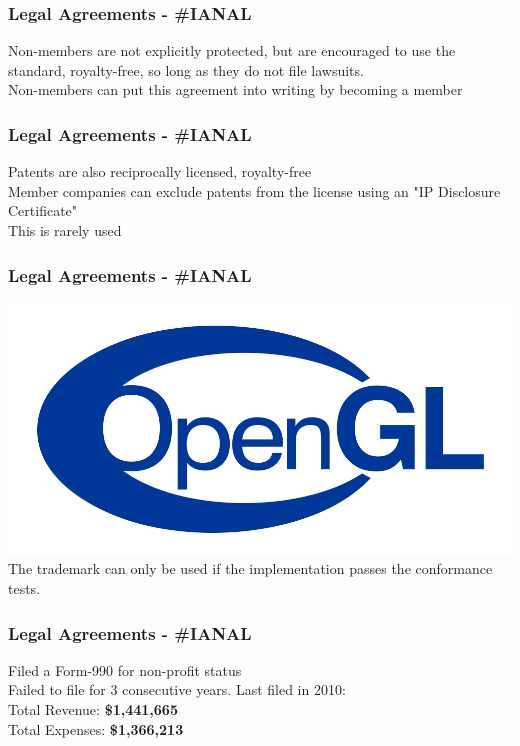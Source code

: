 \documentclass[10pt, compress]{beamer}
\begin{document}
\begin{frame}[fragile]
    \frametitle{Legal Agreements - \#IANAL}
    Non-members are not explicitly protected, but are encouraged to use the standard, royalty-free, so long as they do not file lawsuits.
    \\ \vspace{3mm}
    Non-members can put this agreement into writing by becoming a member
\end{frame}


\begin{frame}[fragile]
    \frametitle{Legal Agreements - \#IANAL}
    Patents are also reciprocally licensed, royalty-free
    \\ \vspace{3mm}
    Member companies can exclude patents from the license using an "IP Disclosure Certificate"
    \\ \vspace{3mm}
    This is rarely used
\end{frame}


\begin{frame}[fragile]
    \frametitle{Legal Agreements - \#IANAL}
    \includegraphics[width=\textwidth]{OpenGL-Logo.png}
    \\ \vspace{3mm}
    The trademark can only be used if the implementation passes the conformance tests.
\end{frame}


\begin{frame}[fragile]
    \frametitle{Legal Agreements - \#IANAL}
    \begin{center}
    Filed a Form-990 for non-profit status
    \\ \vspace{3mm}
    Failed to file for 3 consecutive years. Last filed in 2010:
    \\ \vspace{3mm}
    Total Revenue: \textbf{\$1,441,665}
    \\
    Total Expenses: \textbf{\$1,366,213}
    \end{center}
\end{frame}
\end{document}

